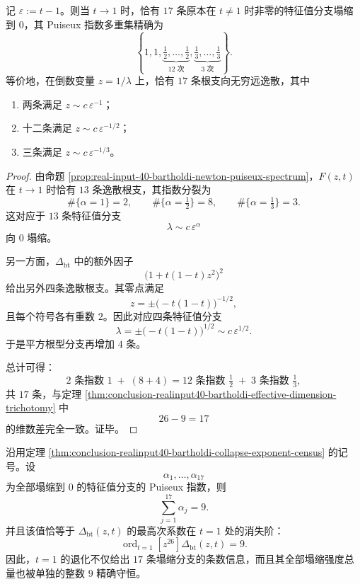 \begin{theorem}[\texorpdfstring{$t=1$}{t=1} 附近的完整谱塌缩指数 census]\label{thm:conclusion-realinput40-bartholdi-collapse-exponent-census}
记 \(\varepsilon:=t-1\)。则当 \(t\to 1\) 时，恰有 \(17\) 条原本在 \(t\neq 1\) 时非零的特征值分支塌缩到 \(0\)，其 Puiseux 指数多重集精确为
\[
\left\{
1,1,\underbrace{\tfrac12,\dots,\tfrac12}_{12\text{ 次}},
\underbrace{\tfrac13,\dots,\tfrac13}_{3\text{ 次}}
\right\}.
\]
等价地，在倒数变量 \(z=1/\lambda\) 上，恰有 \(17\) 条根支向无穷远逸散，其中
\begin{enumerate}
  \item 两条满足 \(z\sim c\,\varepsilon^{-1}\)；
  \item 十二条满足 \(z\sim c\,\varepsilon^{-1/2}\)；
  \item 三条满足 \(z\sim c\,\varepsilon^{-1/3}\)。
\end{enumerate}
\end{theorem}
\begin{proof}
由命题 \ref{prop:real-input-40-bartholdi-newton-puiseux-spectrum}，\(F(z,t)\) 在 \(t\to 1\) 时恰有 \(13\) 条逸散根支，其指数分裂为
\[
\#\{\alpha=1\}=2,\qquad
\#\{\alpha=\tfrac12\}=8,\qquad
\#\{\alpha=\tfrac13\}=3.
\]
这对应于 \(13\) 条特征值分支
\[
\lambda\sim c\,\varepsilon^\alpha
\]
向 \(0\) 塌缩。

另一方面，\(\Delta_{\mathrm{bt}}\) 中的额外因子
\[
\bigl(1+t(1-t)z^2\bigr)^2
\]
给出另外四条逸散根支。其零点满足
\[
z=\pm\bigl(-t(1-t)\bigr)^{-1/2},
\]
且每个符号各有重数 \(2\)。因此对应四条特征值分支
\[
\lambda=\pm\bigl(-t(1-t)\bigr)^{1/2}\sim c\,\varepsilon^{1/2}.
\]
于是平方根型分支再增加 \(4\) 条。

总计可得：
\[
2\text{ 条指数 }1
\;+\;
(8+4)=12\text{ 条指数 }\tfrac12
\;+\;
3\text{ 条指数 }\tfrac13,
\]
共 \(17\) 条，与定理 \ref{thm:conclusion-realinput40-bartholdi-effective-dimension-trichotomy} 中
\[
26-9=17
\]
的维数差完全一致。证毕。
\end{proof}
\begin{theorem}\label{thm:conclusion-realinput40-bartholdi-tropical-mass-conservation}
沿用定理 \ref{thm:conclusion-realinput40-bartholdi-collapse-exponent-census} 的记号。设
\[
\alpha_1,\dots,\alpha_{17}
\]
为全部塌缩到 \(0\) 的特征值分支的 Puiseux 指数，则
\[
\sum_{j=1}^{17}\alpha_j=9.
\]
并且该值恰等于 \(\Delta_{\mathrm{bt}}(z,t)\) 的最高次系数在 \(t=1\) 处的消失阶：
\[
\operatorname{ord}_{t=1}[z^{26}]\Delta_{\mathrm{bt}}(z,t)=9.
\]
因此，\(t=1\) 的退化不仅给出 \(17\) 条塌缩分支的条数信息，而且其全部塌缩强度总量也被单独的整数 \(9\) 精确守恒。
\end{theorem}
